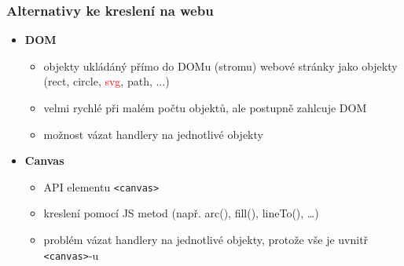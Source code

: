 \documentclass{beamer}
\begin{document}
	

	
	
		\begin{frame}[t,fragile]
		\frametitle{Alternativy ke kreslení na webu}					
		\begin{itemize}
		
		\item \textbf{DOM}
		\begin{itemize}
			\item objekty ukládáný přímo do DOMu (stromu) webové stránky jako objekty (rect, circle, \textcolor{red}{svg}, path, ...)
			\item velmi rychlé při malém počtu objektů, ale postupně zahlcuje DOM
			\item možnost vázat handlery na jednotlivé objekty
		\end{itemize}

		\item \textbf{Canvas}
		\begin{itemize}
			\item API elementu \verb|<canvas>|
			\item kreslení pomocí JS metod (např. arc(), fill(), lineTo(), \dots)
			\item problém vázat handlery na jednotlivé objekty, protože vše je uvnitř \verb|<canvas>|-u
		\end{itemize}				
				
		\end{itemize}	

	\end{frame}
	
		
				{
\begin{frame}[plain]
\end{frame}
}

	
\end{document}

